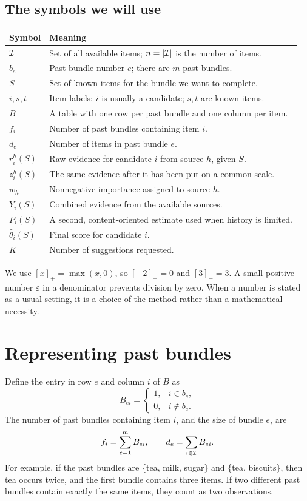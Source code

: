 \documentclass[11pt,a4paper]{article}
\numberwithin{equation}{section}
\begin{document}
\subsection{The symbols we will use}
\begin{center}\small
\begin{tabularx}{\linewidth}{@{}p{.20\linewidth}X@{}}\toprule
Symbol & Meaning \\\midrule
$\mathcal I$ & Set of all available items; $n=|\mathcal I|$ is the number of items. \\
$b_e$ & Past bundle number $e$; there are $m$ past bundles. \\
$S$ & Set of known items for the bundle we want to complete. \\
$i,s,t$ & Item labels: $i$ is usually a candidate; $s,t$ are known items. \\
$B$ & A table with one row per past bundle and one column per item. \\
$f_i$ & Number of past bundles containing item $i$. \\
$d_e$ & Number of items in past bundle $e$. \\
$r_i^h(S)$ & Raw evidence for candidate $i$ from source $h$, given $S$. \\
$z_i^h(S)$ & The same evidence after it has been put on a common scale. \\
$w_h$ & Nonnegative importance assigned to source $h$. \\
$Y_i(S)$ & Combined evidence from the available sources. \\
$P_i(S)$ & A second, content-oriented estimate used when history is limited. \\
$\widehat\theta_i(S)$ & Final score for candidate $i$. \\
$K$ & Number of suggestions requested. \\
\bottomrule\end{tabularx}\end{center}
We use $[x]_+=\max(x,0)$, so $[-2]_+=0$ and $[3]_+=3$. A small positive number $\varepsilon$
in a denominator prevents division by zero. When a number is stated as a usual setting, it
is a choice of the method rather than a mathematical necessity.

\section{Representing past bundles}
Define the entry in row $e$ and column $i$ of $B$ as
\begin{equation}
 B_{ei}=\begin{cases}1,&i\in b_e,\\0,&i\notin b_e.\end{cases}
\end{equation}
The number of past bundles containing item $i$, and the size of bundle $e$, are
\begin{equation}
 f_i=\sum_{e=1}^{m}B_{ei},\qquad d_e=\sum_{i\in\mathcal I}B_{ei}.
\end{equation}
For example, if the past bundles are \{tea, milk, sugar\} and \{tea, biscuits\}, then
tea occurs twice, and the first bundle contains three items. If two different past bundles
contain exactly the same items, they count as two observations.
\end{document}
